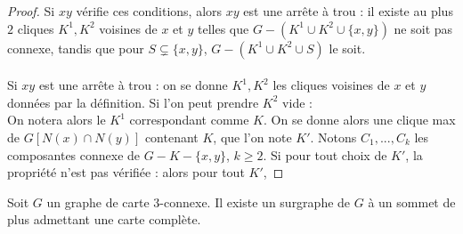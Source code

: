 \documentclass{scrartcl}
\begin{document}
\begin{flushleft}
\begin{prop}
\end{prop}

\begin{proof}
    Si $xy$ vérifie ces conditions, alors $xy$ est une arrête à trou : il existe au plus $2$ cliques $K^1, K^2$ voisines de $x$ et $y$
    telles que $G - (K^1 \cup K^2 \cup \{x,y\})$ ne soit pas connexe, tandis que pour $S \subsetneq \{x,y\}$, $G - (K^1 \cup K^2 \cup S)$
    le soit.
    \\~\\
    Si $xy$ est une arrête à trou : on se donne $K^1, K^2$ les cliques voisines de $x$ et $y$ données par la définition.
    Si l'on peut prendre $K^2$ vide :\\
    On notera alors le $K^1$ correspondant comme $K$. On se donne alors une clique max de $G[N(x) \cap N(y)]$ contenant $K$, que l'on note $K'$.
    Notons $C_1, ..., C_k$ les composantes connexe de $G - K - \{x,y\}$, $k \geq 2$. Si pour tout choix de $K'$, la propriété n'est pas
    vérifiée : alors pour tout $K'$, 
\end{proof}

\begin{lem}\label{3connCompl}
    Soit $G$ un graphe de carte $3$-connexe. Il existe un surgraphe de $G$ à un sommet de plus admettant une carte complète.
\end{lem}


\end{flushleft}
\end{document}
